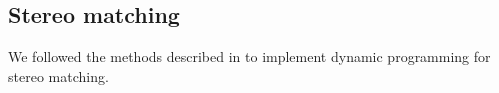 
\subsection{Stereo matching}
\label{sec:stereo}

We followed the methods described in \cite{realtimestereo} to implement dynamic programming for stereo matching.


\begin{comment}
PSEUDOCODE:

A[i,j] = Minimum + Dif(ColorR,ColorL)
At the total beginning, A[0,0] has to be initialized with 0. Afterwards, all others elements are evaluated in the order from the upper left to the lower right corner.
It is absolutely necessary just to include already initialized matrix elements for performing the Min function inside the pseudocode above.
Once the matrix has been filled, a path of minimal cost can be calculated by tracing back through the DP matrix beginning from A[n-1,n-1], and ending in A[0,0] :
DisparityMapL [i,y] = j-i
DisparityMapR [j,y] = i-j
Up = A[i-1,j]
Left = A[i,j-1]
UpLeft = A[i-1,j-1]
Minimum = Min( Up,Left,UpLeft )
case Minimum of
UpLeft : i=i-1;j=j-1
Left : j=j-1
Up : i=i-1
end

For i = 0 to end,
For j = 0 to end,
...

Step 1: CALCULATE MATRIX
a1 = Right[i,y]
a2 = Left[j,y]
a3 = diff(a1,a2)
a4 = a3*scale + weight // denoise
a5 = f(a4, smooth[i,j])
b1 = A[i-1,j]
b2 = A[i,j-1]
b3 = A[i-1,j-1]
b4 = minimum(b1, b2, b3)
b5 = b4 - path[i,j] // Reusing paths
path[i,j] = path[i,j] * 0.875 // Reusing paths
A[i,j] = a5 + b5 // Write DP matrix

Step 2: FIND PATH
c1 = A[i-1,j]
c2 = A[i,j-1]
c3 = A[i-1,j-1]
c4 = minimum(c1, c2, c3)
c1 = c1 + weight1
c2 = c2 + weight2
c3 = c3 + weight3
// Choose new position
if (c4 <= c1) { j = j-1; i = i-1; } else
if (c4 <= c2) { j = j-1 } else
if (c4 <= c3) { i = i-1 }
// Remember paths
path[i,j] = constant
// Write disparity map
disparity[i,y] = j

One improvement we didn't implement: line skipping. (At first, every n’th horizontal line is calculated to find bounding space for possible disparities in between.)

\end{comment}

